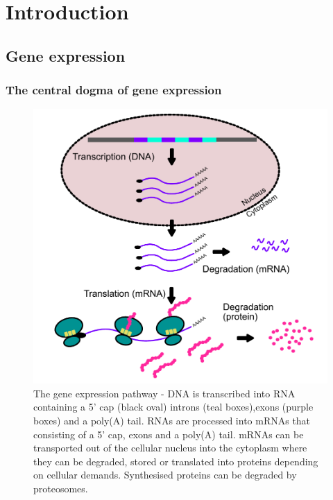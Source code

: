 \documentclass[12pt,openany]{book}
\begin{document}
\clearpage
{} \setcounter{page}{1}

\chapter{Introduction}\section{Gene expression}\subsection{The central dogma of gene expression}

\begin{figure}
  \includegraphics{./figures/geneExprPath_2.pdf}
  \caption{The gene expression pathway - DNA is transcribed into RNA containing a 5' cap (black oval) introns (teal boxes),exons (purple boxes) and a poly(A) tail. RNAs are processed into mRNAs that consisting of a 5' cap, exons and a poly(A) tail. mRNAs can be transported out of the cellular nucleus into the cytoplasm where they can be degraded, stored or translated into proteins depending on cellular demands. Synthesised proteins can be degraded by proteosomes. \label{fig:geneExprPath}}
\end{figure}
\end{document}
